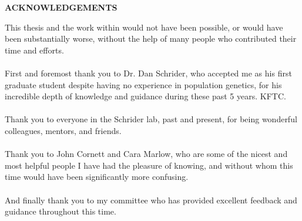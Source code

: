 
\begin{center}
\vspace*{52pt}
{\normalfont \textbf{ACKNOWLEDGEMENTS}}
\end{center}

This thesis and the work within would not have been possible, or would have been substantially worse, without the help of many people who contributed their time and efforts. \\ \\
First and foremost thank you to Dr. Dan Schrider, who accepted me as his first graduate student despite having no experience in population genetics, for his incredible depth of knowledge and guidance during these past 5 years. KFTC. \\ \\
Thank you to everyone in the Schrider lab, past and present, for being wonderful colleagues, mentors, and friends. \\ \\
Thank you to John Cornett and Cara Marlow, who are some of the nicest and most helpful people I have had the pleasure of knowing, and without whom this time would have been significantly more confusing. \\ \\
And finally thank you to my committee who has provided excellent feedback and guidance throughout this time.

\clearpage

